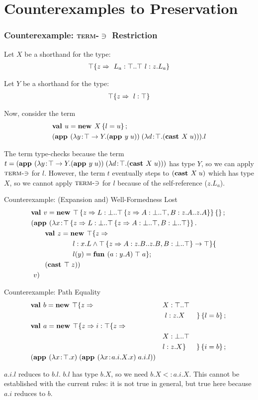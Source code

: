 \documentclass{beamer}
\begin{document}
\section{Counterexamples to Preservation}

\begin{frame}[fragile]
\frametitle{Counterexample: \texorpdfstring{\textsc{term-$\ni$}}{Term-Mem} Restriction}
Let $X$ be a shorthand for the type:
\begin{align*}
\top \{z \Rightarrow 
\ L_a : \top..\top
\ l : z.L_a
 \}
\end{align*}

Let $Y$ be a shorthand for the type:
\begin{align*}
\top \{z \Rightarrow 
\ l : \top
 \}
\end{align*}

Now, consider the term
\begin{align*}
&\mlnew u {X \ldefs{ l = u }}{
\app {(\abs y {\Top \tfun Y} {\app y u})} {(\abs d \Top {\cast X u})}.l
}
\end{align*}

The term type-checks because the term $t=(\textbf{app }(\lambda y\!:\!\top \rightarrow Y.(\textbf{app }y\;u))\;(\lambda d\!:\!\top.(\textbf{cast }X\;u)))$ has type
$Y$, so we can apply $\textsc{term-$\ni$}$ for $l$. However, the term
$t$ eventually steps to ${(\textbf{cast }X\;u)}$ which has type $X$,
so we cannot apply $\textsc{term-$\ni$}$ for $l$ because of the
self-reference ($z.L_a$).
\end{frame}

\begin{frame}[fragile]{Counterexample: (Expansion and) Well-Formedness Lost}
\begin{align*}
&\textbf{val }v = \textbf{new }\top \left\{z \Rightarrow L : \bot..\top \left\{z \Rightarrow A : \bot..\top, B : z.A..z.A \right\} \right\} \left\{\right\} ;\;\\&
(\textbf{app }(\lambda x\!:\!\top \left\{z \Rightarrow L : \bot..\top \left\{z \Rightarrow A : \bot..\top, B : \bot..\top \right\} \right\}.\\&\quad\quad
\textbf{val }z = \textbf{new }\top \{z \Rightarrow \\&\quad\quad\quad\quad\quad\quad
l : x.L \wedge {\top\left\{z \Rightarrow A : z.B..z.B, B : \bot..\top\right\}} \rightarrow \top \}\{\\&\quad\quad\quad\quad\quad\quad
l(y) = \textbf{fun } (a:y.A)\;\top\;a\} ;\;\\&
\quad\quad (\textbf{cast }\top\;z)
)\;\\&\ v)
\end{align*}
\end{frame}

\begin{frame}[fragile]{Counterexample: Path Equality}
\begin{align*}
&\textbf{val }b = \textbf{new }\top \{z \Rightarrow &&X : \top..\top&\\
&&&\ l : z.X& \}\left\{l = b\right\} ;\;\\&
\textbf{val }a = \textbf{new }\top \{z \Rightarrow i : \top \{z \Rightarrow &&&\\
&&&X : \bot..\top\\
&&&l : z.X \}& \}\left\{i = b\right\} ;\;\\&
(\textbf{app }(\lambda x\!:\!\top.x)\;(\textbf{app }(\lambda x\!:\!a.i.X.x)\;a.i.l))
\end{align*}

$a.i.l$ reduces to $b.l$. $b.l$ has type $b.X$, so we need $b.X <:
a.i.X$. This cannot be established with the current rules: it is not
true in general, but true here because $a.i$ reduces to $b$.
\end{frame}
\end{document}
